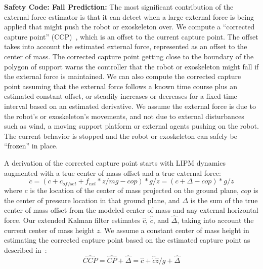 \documentclass[letterpaper,12pt,fullpage]{article}
\begin{document}
{\bf Safety Code: Fall Prediction:}
The most significant contribution of the external force estimator is that it
can detect when a large external force is being applied that might
push the robot or exoskeleton over.
We compute a ``corrected capture point'' (CCP)~\cite{capture},
which is an offset to the current capture point.
The offset 
takes into account the estimated external force, represented as an offset
to the center of mass.
The corrected capture point getting close to the boundary of the polygon of
support warns the controller that the robot or exoskeleton might fall if the external
force is maintained.
We can also compute the corrected capture point assuming that the
external force follows a known time course plus an estimated constant offset,
or steadily increases or decreases for a fixed time interval
based on an estimated derivative.
We assume the external force is due to the robot's or exoskeleton's
movements, and not
due to external disturbances such as wind, a moving support platform
or external agents pushing on the robot.
The current
behavior is stopped and the robot or exoskeleton can safely be ``frozen'' in place.

A derivation of the corrected capture point starts with LIPM dynamics
augmented with a true center of mass offset and a true external force:
\begin{equation}
\ddot{c} = (c + c_{offset} + f_{ext}*z/mg - cop)*g/z
= (c + \Delta - cop)*g/z
\end{equation}
where $c$ is the location of the center of mass projected on the ground
plane,
$cop$ is the center of pressure
location in that ground plane, and $\Delta$ is the sum of the true center of mass
offset from the modeled center of mass and any external horizontal force.
Our extended Kalman filter estimates $\hat{c}$, $\hat{\dot{c}}$, and
$\hat{\Delta}$,
taking into account the
current center of mass height $z$. We assume a constant center of mass height
in estimating the corrected capture point based on the estimated capture point
as described in~\cite{capture}:
\begin{equation}
\widehat{CCP} = \widehat{CP} + \hat{\Delta} 
= \hat{c} + \hat{\dot{c}}\hat{z}/g + \hat{\Delta}
\end{equation}
\end{document}
